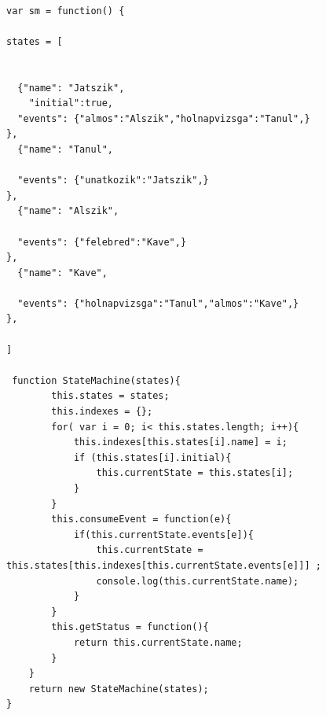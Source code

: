 \begin{lstlisting}[caption=A generálás eredménye] 

var sm = function() {

states = [


  {"name": "Jatszik", 
    "initial":true, 
  "events": {"almos":"Alszik","holnapvizsga":"Tanul",}
},
  {"name": "Tanul", 
   
  "events": {"unatkozik":"Jatszik",}
},
  {"name": "Alszik", 
   
  "events": {"felebred":"Kave",}
},
  {"name": "Kave", 
   
  "events": {"holnapvizsga":"Tanul","almos":"Kave",}
},

]

 function StateMachine(states){
        this.states = states;
        this.indexes = {}; 
        for( var i = 0; i< this.states.length; i++){
            this.indexes[this.states[i].name] = i;
            if (this.states[i].initial){
                this.currentState = this.states[i];
            }
        }
        this.consumeEvent = function(e){
            if(this.currentState.events[e]){
                this.currentState = this.states[this.indexes[this.currentState.events[e]]] ;
                console.log(this.currentState.name);
            }
        }
        this.getStatus = function(){
            return this.currentState.name;
        }
    }
    return new StateMachine(states);
}

\end{lstlisting}
